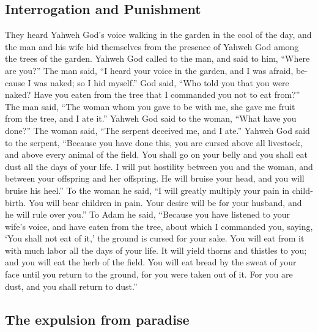 \begin{paracol}{2}
\begin{otherlanguage}{english}
\hypertarget{interrogation-and-punishment}{%
\subsection{Interrogation and
Punishment}\label{interrogation-and-punishment}}

 They heard Yahweh God's voice walking in the garden in
the cool of the day, and the man and his wife hid themselves from the
presence of Yahweh God among the trees of the garden. 
Yahweh God called to the man, and said to him, ``Where are you?''
 The man said, ``I heard your voice in the garden, and I
was afraid, because I was naked; so I hid myself.''  God
said, ``Who told you that you were naked? Have you eaten from the tree
that I commanded you not to eat from?''  The man said,
``The woman whom you gave to be with me, she gave me fruit from the
tree, and I ate it.''  Yahweh God said to the woman,
``What have you done?'' The woman said, ``The serpent deceived me, and I
ate.''  Yahweh God said to the serpent, ``Because you
have done this, you are cursed above all livestock, and above every
animal of the field. You shall go on your belly and you shall eat dust
all the days of your life.  I will put hostility between
you and the woman, and between your offspring and her offspring. He will
bruise your head, and you will bruise his heel.''  To the
woman he said, ``I will greatly multiply your pain in childbirth. You
will bear children in pain. Your desire will be for your husband, and he
will rule over you.''  To Adam he said, ``Because you
have listened to your wife's voice, and have eaten from the tree, about
which I commanded you, saying, `You shall not eat of it,' the ground is
cursed for your sake. You will eat from it with much labor all the days
of your life.  It will yield thorns and thistles to you;
and you will eat the herb of the field.  You will eat
bread by the sweat of your face until you return to the ground, for you
were taken out of it. For you are dust, and you shall return to dust.''

\hypertarget{the-expulsion-from-paradise}{%
\subsection{The expulsion from
paradise}\label{the-expulsion-from-paradise}}


\end{otherlanguage}
\end{paracol}
